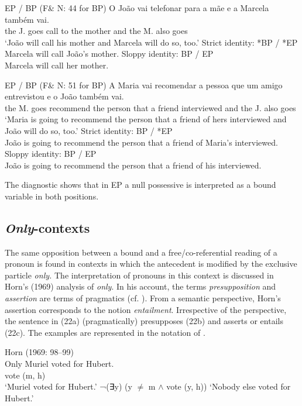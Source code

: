 \documentclass[output=paper]{langsci/langscibook}
\begin{document}
\ea%
         EP / BP (F\& N: 44 for BP)\label{ex:wein:20}
    \ea
    \gll O João vai telefonar para a mãe e a Marcela também vai.\\
         the J. goes call to the mother and the M. also goes  \\
    \glt ‘João will call his mother and Marcela will do so, too.’
    \ex Strict identity: *BP / *EP\\Marcela will call João’s mother.
    \ex Sloppy identity: BP / EP\\Marcela will call her mother.
    \z
\z

\ea%
         EP / BP (F\& N: 51 for BP)\label{ex:wein:21}
    \ea
    \gll A Maria vai recomendar a pessoa que um amigo entrevistou e o João também vai.\\
         the M. goes recommend the person that a friend interviewed and the J. also goes\\
    \glt ‘Maria is going to recommend the person that a friend of hers interviewed and João will do so, too.’
    \ex Strict identity: BP / *EP\\João is going to recommend the person that a friend of Maria’s interviewed.\\
    \ex Sloppy identity: BP / EP\\João is going to recommend the person that a friend of his interviewed. 
    \z
\z

The diagnostic shows that in EP a null possessive is interpreted as a bound variable in both positions.

\subsection{\textit{Only}-contexts}%

The same opposition between a bound and a free/co-referential reading of a pronoun is found in contexts in which the antecedent is modified by the exclusive particle \textit{only.} The interpretation of pronouns in this context is discussed in Horn’s (1969) analysis of \textit{only}. In his account, the terms \textit{presupposition} and \textit{assertion} are terms of pragmatics (cf. \citealt{Pagin2016}). From a semantic perspective, Horn’s assertion corresponds to the notion \textit{entailment}. Irrespective of the perspective, the sentence in (22a) (pragmatically) presupposes (22b) and asserts or entails (22c). The examples are represented in the notation of \citet{Horn1969}. 

\ea%
    Horn (1969: 98–99)\label{ex:wein:22}\\
    \ea 
    Only Muriel voted for Hubert.\\
    vote (m, h)\\   
    \glt ‘Muriel voted for Hubert.’
    \ex  ¬(∃y) (y ${\neq}$ m ${\wedge}$ vote (y, h))
    \glt ‘Nobody else voted for Hubert.’
    \z
\z
\end{document}
